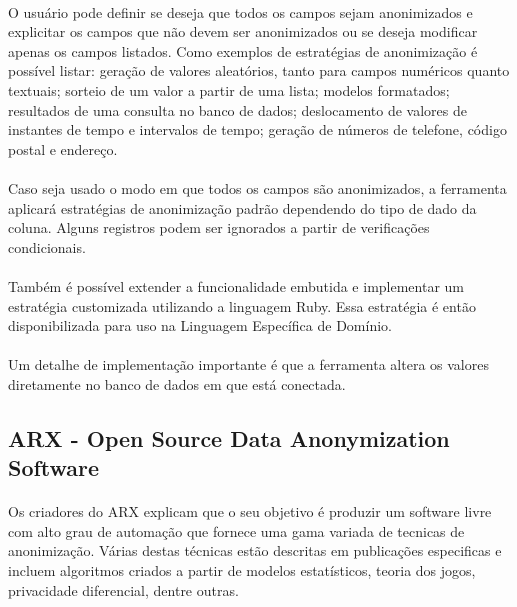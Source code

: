 \paragraph{} O usuário pode definir se deseja que todos os campos sejam anonimizados e explicitar os campos que não devem ser anonimizados ou se deseja modificar apenas os campos listados. Como exemplos de estratégias de anonimização é possível listar: geração de valores aleatórios, tanto para campos numéricos quanto textuais; sorteio de um valor a partir de uma lista; modelos formatados; resultados de uma consulta 
no banco de dados; deslocamento de valores de instantes de tempo e intervalos de tempo; geração de números de telefone, código postal e endereço. 

\paragraph{} Caso seja usado o modo em que todos os campos são anonimizados, a ferramenta aplicará estratégias de anonimização padrão dependendo do tipo de dado da coluna. Alguns registros podem ser ignorados a partir de verificações condicionais.

\paragraph{} Também é possível extender a funcionalidade embutida e implementar um estratégia customizada utilizando a linguagem Ruby. Essa estratégia é então disponibilizada para uso na Linguagem Específica de Domínio.

\paragraph{} Um detalhe de implementação importante é que a ferramenta altera os valores diretamente no banco de dados em que está conectada.


\subsection{ARX - Open Source Data Anonymization Software}

\paragraph{} Os criadores do ARX\cite{prasser2020flexible} explicam que o seu objetivo é produzir um software livre com alto grau de automação que fornece uma gama variada de tecnicas de anonimização. Várias destas técnicas estão descritas em publicações especificas e incluem algoritmos criados a partir de modelos estatísticos, teoria dos jogos, privacidade diferencial, dentre outras.

